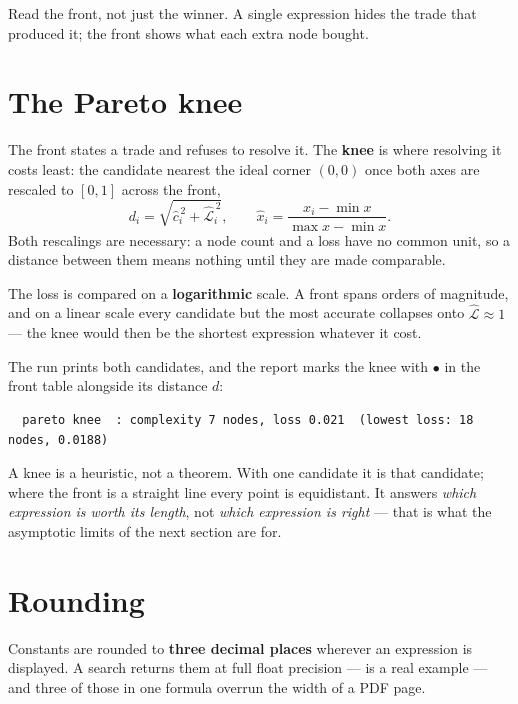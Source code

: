\begin{pnote}
Read the front, not just the winner. A single expression hides the trade that
produced it; the front shows what each extra node bought.
\end{pnote}

\section{The Pareto knee}

The front states a trade and refuses to resolve it. The \textbf{knee} is where
resolving it costs least: the candidate nearest the ideal corner $(0,0)$ once
both axes are rescaled to $[0,1]$ across the front,
\[
  d_i = \sqrt{\hat c_i^{\,2} + \hat{\mathcal{L}}_i^{\,2}},
  \qquad
  \hat x_i = \frac{x_i - \min x}{\max x - \min x} .
\]
Both rescalings are necessary: a node count and a loss have no common unit, so
a distance between them means nothing until they are made comparable.

The loss is compared on a \textbf{logarithmic} scale. A front spans orders of
magnitude, and on a linear scale every candidate but the most accurate
collapses onto $\hat{\mathcal{L}} \approx 1$ --- the knee would then be the
shortest expression whatever it cost.

The run prints both candidates, and the report marks the knee with
$\bullet$ in the front table alongside its distance $d$:

\begin{lstlisting}
  pareto knee  : complexity 7 nodes, loss 0.021  (lowest loss: 18 nodes, 0.0188)
\end{lstlisting}

\begin{pwarn}
A knee is a heuristic, not a theorem. With one candidate it is that candidate;
where the front is a straight line every point is equidistant. It answers
\emph{which expression is worth its length}, not \emph{which expression is
right} --- that is what the asymptotic limits of the next section are for.
\end{pwarn}

\section{Rounding}

Constants are rounded to \textbf{three decimal places} wherever an expression
is displayed. A search returns them at full float precision ---
 is a real example --- and three of those in
one formula overrun the width of a PDF page.

